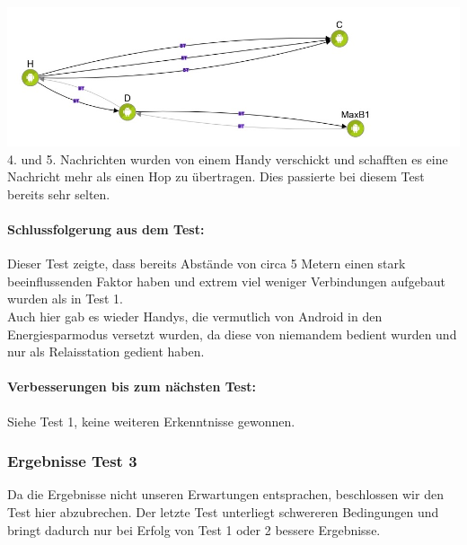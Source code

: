\includegraphics[width=1.0\textwidth]{belege/grosstests/Bilder/Test2Misserfolg6.jpg}\\ 4. und
5. Nachrichten wurden von einem Handy verschickt und schafften es eine
Nachricht mehr als einen Hop zu übertragen. Dies passierte bei diesem
Test bereits sehr selten.\\

\paragraph{Schlussfolgerung aus dem Test:}

Dieser Test zeigte, dass bereits Abstände von circa 5 Metern einen stark
beeinflussenden Faktor haben und extrem viel weniger Verbindungen
aufgebaut wurden als in Test 1.\\

Auch hier gab es wieder Handys, die vermutlich von Android in den
Energiesparmodus versetzt wurden, da diese von niemandem bedient wurden
und nur als Relaisstation gedient haben.

\paragraph{Verbesserungen bis zum nächsten Test:}

Siehe Test 1, keine weiteren Erkenntnisse gewonnen.


\subsubsection{Ergebnisse Test 3}

Da die Ergebnisse nicht unseren Erwartungen entsprachen, beschlossen wir
den Test hier abzubrechen. Der letzte Test unterliegt schwereren
Bedingungen und bringt dadurch nur bei Erfolg von Test 1 oder 2 bessere
Ergebnisse.

